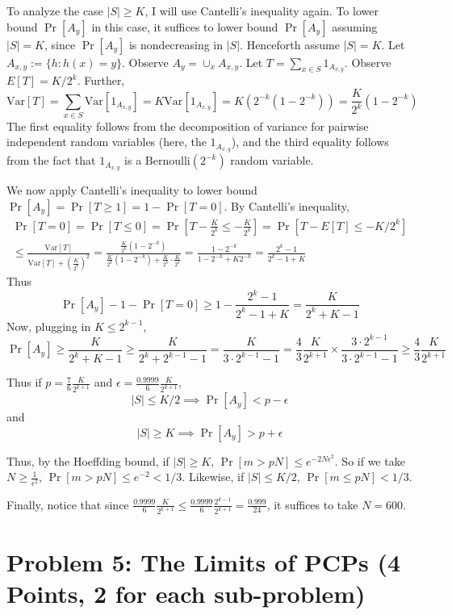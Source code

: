 \documentclass{article}
\def \Var{\text{Var}}
\begin{document}
To analyze the case $|S| \geq K$, I will use Cantelli's inequality again.
To lower bound $\Pr[A_y]$ in this case, it suffices to lower bound $\Pr[A_y]$
assuming $|S| = K$, since $\Pr[A_y]$ is nondecreasing in $|S|$.
Henceforth assume $|S| = K$.
Let $A_{x, y} := \{h : h(x) = y\}$.  Observe $A_y = \cup_x A_{x, y}$.
Let $T = \sum_{x \in S} 1_{A_{x, y}}$.
Observe $E[T] = K/2^k$.
Further,
$$
\Var[T] = \sum_{x \in S} \Var[1_{A_{x, y}}] = K \Var[1_{A_{x, y}}] = K(2^{-k}(1 - 2^{-k})) = \frac{K}{2^k}(1 - 2^{-k})
$$
The first equality follows from the decomposition of variance for pairwise independent random variables (here, the $1_{A_{x, y}}$), and the third equality follows from the fact that $1_{A_{x, y}}$ is a $\text{Bernoulli}(2^{-k})$ random variable.

We now apply Cantelli's inequality to lower bound $\Pr[A_y] = \Pr[T \geq 1] = 1 - \Pr[T = 0]$.
By Cantelli's inequality,
\begin{multline*}
\Pr[T = 0] = \Pr[T \leq 0] = \Pr[T - \frac{K}{2^k} \leq -\frac{K}{2^{k}}]
= \Pr[T - E[T] \leq -K/2^k] \\
\leq \frac{\Var[T]}{\Var[T] + (\frac{K}{2^k})^2}
 = \frac{
	\frac{K}{2^k}(1 - 2^{-k})
 }{
	\frac{K}{2^k}(1 - 2^{-k}) + \frac{K}{2^k} \cdot \frac{K}{2^k} 
 } =
 \frac{1 - 2^{-k}}{1 - 2^{-k} + K2^{-k}}
 = \frac{2^k - 1}{2^k - 1 + K}
\end{multline*}
Thus
$$
\Pr[A_y] - 1 - \Pr[T = 0] \geq 1 - \frac{2^k - 1}{2^k - 1 + K}
= \frac{K}{2^k + K - 1}
$$
Now, plugging in $K \leq 2^{k-1}$,
$$
\Pr[A_y] \geq \frac{K}{2^k + K - 1} \geq \frac{K}{2^k + 2^{k-1} - 1}
= \frac{K}{3 \cdot 2^{k-1} - 1}
= \frac{4}{3}\frac{K}{2^{k+1}} \times \frac{3 \cdot 2^{k-1}}{3 \cdot 2^{k-1} - 1}
\geq \frac{4}{3}\frac{K}{2^{k+1}}
$$

Thus if $p = \frac{7}{6}\frac{K}{2^{k+1}}$ and $\epsilon = \frac{0.9999}{6}\frac{K}{2^{k+1}}$,
$$
|S| \leq K/2 \implies \Pr[A_y] < p - \epsilon
$$
and
$$
|S| \geq K \implies \Pr[A_y] > p + \epsilon
$$

Thus, by the Hoeffding bound, if $|S| \geq K$, $\Pr[m > p N] \leq e^{-2N \epsilon^2}$.
So if we take $N \geq \frac{1}{\epsilon^2}$, $\Pr[m > p N] \leq e^{-2} < 1/3$.
Likewise, if $|S| \leq K/2$, $\Pr[m \leq pN] < 1/3$.

Finally, notice that since $\frac{0.9999}{6}\frac{K}{2^{k+1}} \leq \frac{0.9999}{6} \frac{2^{k-1}}{2^{k+1}} = \frac{0.999}{24}$,
it suffices to take $N = 600$.

\newpage
\section*{Problem 5: The Limits of PCPs (4 Points, 2 for each sub-problem)}
\end{document}
